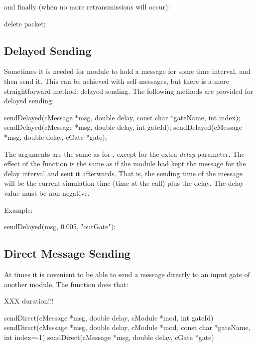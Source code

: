 and finally (when no more retransmissions will occur):

\begin{cpp}
delete packet;
\end{cpp}


\subsection{Delayed Sending}
\label{sec:simple-modules:delayed-sending}

Sometimes it is needed for module to hold a message for some time interval,
and then send it. This can be achieved with self-messages, but there is a
more straightforward method: delayed sending. The
following methods are provided for delayed sending:

\begin{cpp}
sendDelayed(cMessage *msg, double delay, const char *gateName, int index);
sendDelayed(cMessage *msg, double delay, int gateId);
sendDelayed(cMessage *msg, double delay, cGate *gate);
\end{cpp}

The arguments are the same as for , except for the extra \textit{delay}
parameter. The effect of the function is the same as if the module
had kept the message for the delay interval and sent it afterwards.
That is, the sending time of the message will be the current
simulation time (time at the  call) plus the delay.
The delay value must be non-negative.

Example:

\begin{cpp}
sendDelayed(msg, 0.005, "outGate");
\end{cpp}



\subsection{Direct Message Sending}
\label{sec:simple-modules:direct-sending}

At times it is covenient to be able to send a message directly to an input
gate of another module. The  function does that:

XXX duration!!!

\begin{cpp}
sendDirect(cMessage *msg, double delay, cModule *mod, int gateId)
sendDirect(cMessage *msg, double delay, cModule *mod, const char *gateName, int index=-1)
sendDirect(cMessage *msg, double delay, cGate *gate)
\end{cpp}

